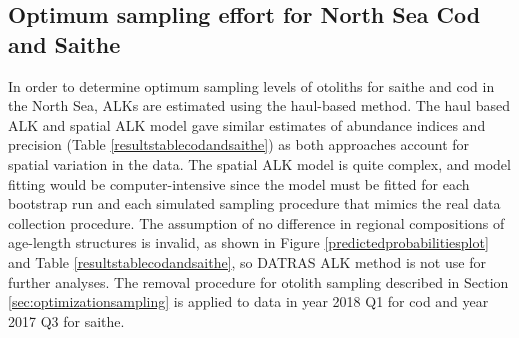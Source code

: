 \documentclass[a4paper 12pt]{article}
\numberwithin{equation}{section}
\begin{document}
%
%

\clearpage
\subsection{Optimum sampling effort for North Sea Cod and Saithe}
\label{sec:optimumeffortresults}
In order to determine optimum sampling levels of otoliths for saithe and cod in the North Sea, ALKs are estimated using the haul-based  method.  The haul based ALK and spatial ALK model gave similar estimates of abundance indices and precision (Table \ref{resultstablecodandsaithe}) as both approaches account for spatial variation in the data. The spatial ALK model is  quite complex, and model fitting would be computer-intensive since the model must be fitted for each bootstrap run and each simulated sampling procedure that mimics the real data collection procedure. The assumption of no difference in regional compositions of age-length structures is invalid,  as shown in Figure \ref{predictedprobabilitiesplot} and Table \ref{resultstablecodandsaithe},  so DATRAS ALK method is not use for further analyses. The removal procedure for otolith sampling described in Section \ref{sec:optimizationsampling} is applied to data in year 2018 Q1 for cod and year 2017 Q3 for saithe.
\end{document}
